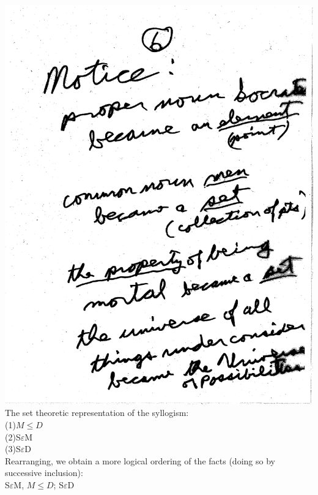 \documentclass[10pt,a4paper]{article}
\begin{document}
\includegraphics[scale=.5]{Pages/ST_6} 
\newpage
The set theoretic representation of the syllogism:\\
(1)$M\leq D$\\
(2)S$\varepsilon$M\\
(3)S$\varepsilon$D\\
Rearranging, we obtain a more logical ordering of the facts (doing so by successive inclusion):\\ S$\varepsilon$M, $M\leq D$; S$\varepsilon$D\\
\end{document}
